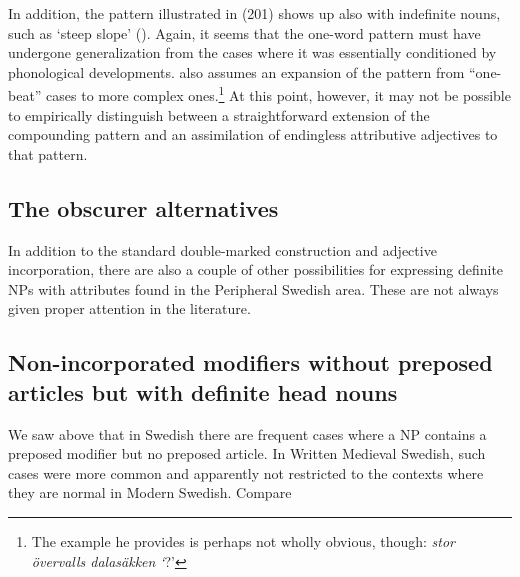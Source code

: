 In addition, the pattern illustrated in (201) shows up also with indefinite nouns, such as  ‘steep slope’ (\citet[52]{Levander1909}). Again, it seems that the one-word pattern must have undergone generalization from the cases where it was essentially conditioned by phonological developments. \citet[103]{Dahlstedt1962} also assumes an expansion of the pattern from “one-beat” cases to more complex ones.\footnote{ The example he provides is perhaps not wholly obvious, though: \textit{stor övervalls dalasäkken }\textit{‘}?’} At this point, however, it may not be possible to empirically distinguish between a straightforward extension of the compounding pattern and an assimilation of endingless attributive adjectives to that pattern. 


\subsection{The obscurer alternatives}
\label{bkm:Ref105224927}
In addition to the standard double-marked construction and adjective incorporation, there are also a couple of other possibilities for expressing definite NPs with attributes found in the Peripheral Swedish area. These are not always given proper attention in the literature. 


\subsection{Non-incorporated modifiers without preposed articles but with definite head nouns}
\label{bkm:Ref154984033}
We saw above that in Swedish there are frequent cases where a NP contains a preposed modifier but no preposed article. In Written Medieval Swedish, such cases were more common and apparently not restricted to the contexts where they are normal in Modern Swedish. Compare 


\item 

